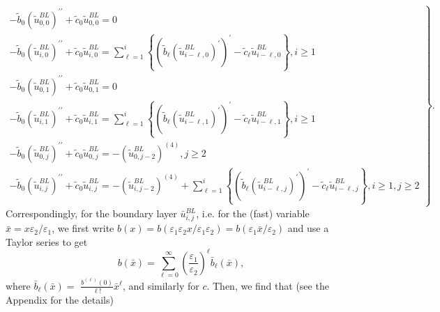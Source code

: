 \documentclass[10pt,a4paper]{amsart}
\begin{document}
\begin{equation}
\left. 
\begin{array}{c}
-\tilde{b}_{0}\left(\tilde{u}^{BL}_{0,0}\right)^{\prime \prime }+\tilde{c}_{0}\tilde{u}^{BL}_{0,0}=0 \\
-\tilde{b}_{0}\left(\tilde{u}^{BL}_{i,0}\right)^{\prime \prime }+\tilde{c}_{0}\tilde{u}^{BL}_{i,0}=%
\sum_{\ell =1}^{i}\left\{ \left( \tilde{b}_{\ell }%
\left(\tilde{u}^{BL}_{i-\ell ,0}\right)^{\prime }\right) ^{\prime }-\tilde{c}_{\ell }\tilde{u}^{BL}_{i-\ell ,0}\right\} ,i\geq 1 \\
-\tilde{b}_{0}\left(\tilde{u}^{BL}_{0,1}\right)^{\prime \prime }+\tilde{c}_{0}\tilde{u}^{BL}_{0,1}=0 \\
-\tilde{b}_{0}\left(\tilde{u}^{BL}_{i,1}\right)^{\prime \prime }+\tilde{c}_{0}\tilde{u}^{BL}_{i,1}=%
\sum_{\ell =1}^{i}\left\{ \left( \tilde{b}_{\ell }\left(\tilde{u}^{BL}_{i-\ell ,1}\right)^{\prime }\right) ^{\prime }-\tilde{c}_{\ell }\tilde{u}^{BL}_{i-\ell ,1}\right\} ,i\geq 1 \\
-\tilde{b}_{0}\left(\tilde{u}^{BL}_{0,j}\right)^{\prime \prime }+\tilde{c}_{0}\tilde{u}^{BL}_{0,j}=-\left(\tilde{u}^{BL}_{0,j-2}\right)^{(4)},j\geq 2 \\
-\tilde{b}_{0}\left(\tilde{u}^{BL}_{i,j}\right)^{\prime \prime }+\tilde{c}_{0}\tilde{u}^{BL}_{i,j}=-\left(\tilde{u}^{BL}_{i,j-2}\right)^{(4)}+\sum_{\ell =1}^{i}\left\{ \left( \tilde{b}_{\ell }%
\left(\tilde{u}^{BL}_{i-\ell ,j}\right)^{\prime }\right) ^{\prime }-\tilde{c}_{\ell }\tilde{u}^{BL}_{i-\ell ,j}\right\} ,i\geq 1,j\geq 2%
\end{array}%
\right\}.  \label{ut_ij}
\end{equation}
%
Correspondingly, for the boundary layer $\bar{u}_{i,j}^{BL}$, i.e. for the (fast)
variable $\bar{x}=x\varepsilon _{2}/\varepsilon _{1}$, we first write 
$b(x)=b(\varepsilon _{1}\varepsilon _{2}x/\varepsilon
_{1}\varepsilon _{2})=b(\varepsilon _{1}\bar{x}/\varepsilon _{2})$ and use a Taylor
series to get
%
\begin{equation*}
b(\bar{x})=\sum_{\ell =0}^{\infty } \left( \frac{\varepsilon _{1}}{\varepsilon _{2}}\right) ^{\ell }\bar{b}_{\ell }(\bar{x}),
\end{equation*}
%
where $\bar{b}_{\ell }(\bar{x})=$ $\frac{b^{(\ell )}(0)}{\ell !}\bar{x}^{\ell }$, and
similarly for $c$. Then, we find that (see the Appendix for the details)
%
\end{document}
